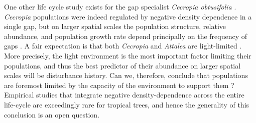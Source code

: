 \documentclass[b5paper,justified]{tufte-book} %
\begin{document}
One other life cycle study exists for the gap specialist \textit{Cecropia obtusifolia} \citep{Alvarez-Buylla1994}. \textit{Cecropia} populations were indeed regulated by negative density dependence in a single gap, but on larger spatial scales the population structure, relative abundance, and population growth rate depend principally on the frequency of gaps \citep[see e.g.][]{Alvarez-Buylla1994}. A fair expectation is that both \textit{Cecropia} and \textit{Attalea} are light-limited \citep{Foster1982a, Alvarez-Buylla1994, Araus1994}. More precisely, the light environment is the most important factor limiting their populations, and thus the best predictor of their abundance on larger spatial scales will be disturbance history. Can we, therefore, conclude that populations are foremost limited by the capacity of the environment to support them \citep[e.g.][]{White2004}? Empirical studies that integrate negative density-dependence across the entire life-cycle are exceedingly rare for tropical trees, and hence the generality of this conclusion is an open question. \begin{fullwidth}
 	

\end{fullwidth}
\end{document}
